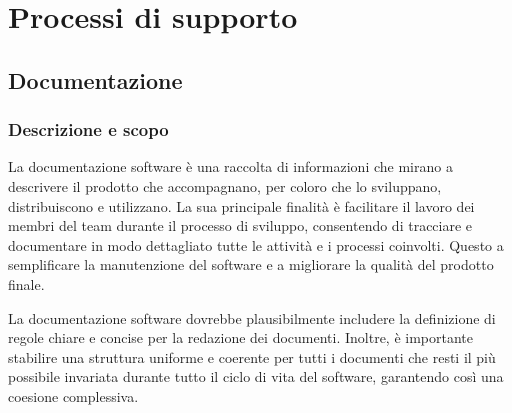 \section{Processi di supporto}
\subsection{Documentazione}

\subsubsection{Descrizione e scopo} %

La documentazione software è una raccolta di informazioni che mirano a descrivere il prodotto che accompagnano, per coloro che lo sviluppano, distribuiscono e utilizzano. La sua principale finalità è facilitare il lavoro dei membri del team durante il processo di sviluppo, consentendo di tracciare e documentare in modo dettagliato tutte le attività e i processi coinvolti. Questo a semplificare la manutenzione del software e a migliorare la qualità del prodotto finale.

La documentazione software dovrebbe plausibilmente includere la definizione di regole chiare e concise per la redazione dei documenti. Inoltre, è importante stabilire una struttura uniforme e coerente per tutti i documenti che resti il più possibile invariata durante tutto il ciclo di vita del software, garantendo così una coesione complessiva.

